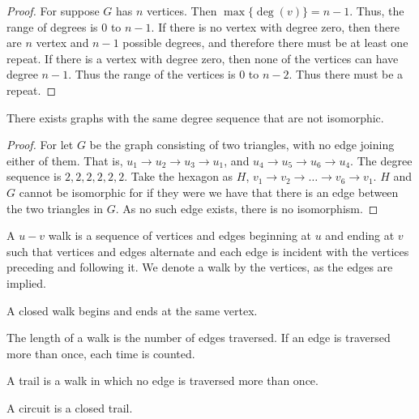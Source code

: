 \documentclass[crop=false,class=book,oneside]{standalone}
\begin{document}
        \begin{proof}
        For suppose $G$ has $n$ vertices. Then $\max\{\deg(v)\} = n-1$. Thus, the range of degrees is $0$ to $n-1$. If there is no vertex with degree zero, then there are $n$ vertex and $n-1$ possible degrees, and therefore there must be at least one repeat. If there is a vertex with degree zero, then none of the vertices can have degree $n-1$. Thus the range of the vertices is $0$ to $n-2$. Thus there must be a repeat. 
        \end{proof}
        \begin{theorem}
        There exists graphs with the same degree sequence that are not
        isomorphic.
        \end{theorem}
        \begin{proof}
        For let $G$ be the graph consisting of two triangles, with no edge joining either of them. That is, $u_1\rightarrow u_2 \rightarrow u_3\rightarrow u_1$, and $u_4\rightarrow u_5 \rightarrow u_6 \rightarrow u_4$. The degree sequence is $2,2,2,2,2,2$. Take the hexagon as $H$, $v_1\rightarrow v_2 \rightarrow \hdots \rightarrow v_6 \rightarrow v_1$. $H$ and $G$ cannot be isomorphic for if they were we have that there is an edge between the two triangles in $G$. As no such edge exists, there is no isomorphism.
        \end{proof}
        \begin{definition}
        A $u-v$ walk is a sequence of vertices and edges beginning at $u$ and ending at $v$ such that vertices and edges alternate and each edge is incident with the vertices preceding and following it. We denote a walk by the vertices, as the edges are implied.
        \end{definition}
        \begin{definition}
        A closed walk begins and ends at the same vertex.
        \end{definition}
        \begin{definition}
        The length of a walk is the number of edges traversed. If an edge is traversed more than once, each time is counted.
        \end{definition}
        \begin{definition}
        A trail is a walk in which no edge is traversed more than once.
        \end{definition}
        \begin{definition} A circuit is a closed trail.
        \end{definition}
\end{document}
